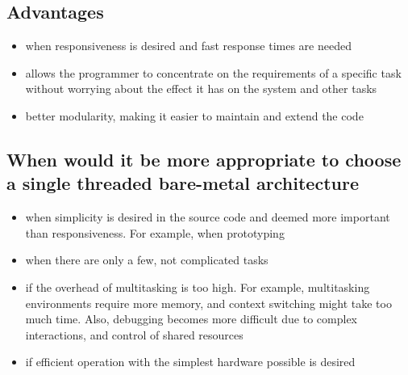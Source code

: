 \subsection*{Advantages}
\begin{itemize}
  \item when responsiveness is desired and fast response times are needed
  \item allows the programmer to concentrate on the requirements of a
    specific task without worrying about the effect it has on the system and
    other tasks
  \item better modularity, making it easier to maintain and extend the code
\end{itemize}

\subsection*{When would it be more appropriate to choose a single threaded
  bare-metal architecture}

\begin{itemize}
  \item when simplicity is desired in the source code and deemed more important
    than responsiveness. For example, when prototyping
  \item when there are only a few, not complicated tasks
  \item if the overhead of multitasking is too high. For example, multitasking
    environments require more memory, and context switching might take too much
    time. Also, debugging becomes more difficult due to complex interactions,
    and control of shared resources
  \item if efficient operation with the simplest hardware possible is desired
\end{itemize}
